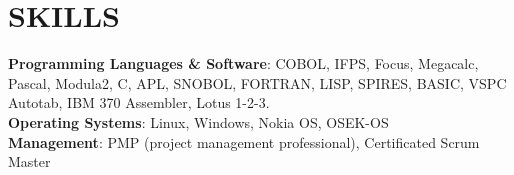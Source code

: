 
\section{SKILLS} \textbf{Programming Languages \& Software}: COBOL, IFPS, Focus, 
         Megacalc, Pascal, Modula2, C, APL, SNOBOL, 
                FORTRAN, LISP, SPIRES, BASIC, VSPC Autotab, 
                IBM 370 Assembler, Lotus 1-2-3. \\
                \textbf{Operating Systems}: Linux, Windows, Nokia OS, OSEK-OS \\
                \textbf{Management}: PMP (project management professional), Certificated Scrum Master
